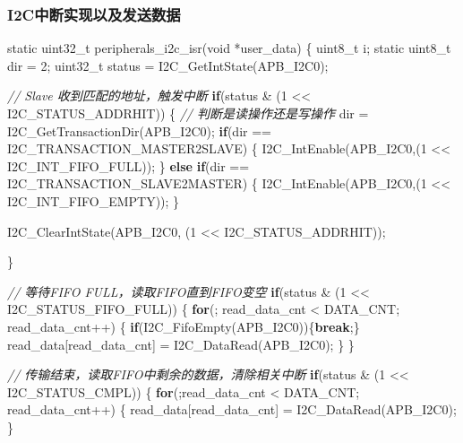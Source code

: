 \documentclass[
  12pt,
]{book}
\newenvironment{Shaded}{\begin{snugshade}}{\end{snugshade}}
\newcommand{\CommentTok}[1]{\textcolor[rgb]{0.56,0.35,0.01}{\textit{#1}}}
\newcommand{\ControlFlowTok}[1]{\textcolor[rgb]{0.13,0.29,0.53}{\textbf{#1}}}
\newcommand{\DataTypeTok}[1]{\textcolor[rgb]{0.13,0.29,0.53}{#1}}
\newcommand{\DecValTok}[1]{\textcolor[rgb]{0.00,0.00,0.81}{#1}}
\newcommand{\NormalTok}[1]{#1}
\begin{document}
\hypertarget{i2cux4e2dux65adux5b9eux73b0ux4ee5ux53caux53d1ux9001ux6570ux636e-1}{%
\subsubsection{I2C中断实现以及发送数据}\label{i2cux4e2dux65adux5b9eux73b0ux4ee5ux53caux53d1ux9001ux6570ux636e-1}}

\begin{Shaded}
\begin{Highlighting}[]
\DataTypeTok{static} \DataTypeTok{uint32_t}\NormalTok{ peripherals_i2c_isr(}\DataTypeTok{void}\NormalTok{ *user_data)}
\NormalTok{\{}
  \DataTypeTok{uint8_t}\NormalTok{ i;}
  \DataTypeTok{static} \DataTypeTok{uint8_t}\NormalTok{ dir = }\DecValTok{2}\NormalTok{;}
  \DataTypeTok{uint32_t}\NormalTok{ status = I2C_GetIntState(APB_I2C0);}

  \CommentTok{// Slave 收到匹配的地址，触发中断}
  \ControlFlowTok{if}\NormalTok{(status & (}\DecValTok{1}\NormalTok{ << I2C_STATUS_ADDRHIT))}
\NormalTok{  \{}
    \CommentTok{// 判断是读操作还是写操作}
\NormalTok{    dir = I2C_GetTransactionDir(APB_I2C0);}
    \ControlFlowTok{if}\NormalTok{(dir == I2C_TRANSACTION_MASTER2SLAVE)}
\NormalTok{    \{}
\NormalTok{        I2C_IntEnable(APB_I2C0,(}\DecValTok{1}\NormalTok{ << I2C_INT_FIFO_FULL));}
\NormalTok{    \}}
    \ControlFlowTok{else} \ControlFlowTok{if}\NormalTok{(dir == I2C_TRANSACTION_SLAVE2MASTER)}
\NormalTok{    \{}
\NormalTok{        I2C_IntEnable(APB_I2C0,(}\DecValTok{1}\NormalTok{ << I2C_INT_FIFO_EMPTY));}
\NormalTok{    \}}

\NormalTok{    I2C_ClearIntState(APB_I2C0, (}\DecValTok{1}\NormalTok{ << I2C_STATUS_ADDRHIT));}

\NormalTok{  \}}
  
  \CommentTok{// 等待FIFO FULL，读取FIFO直到FIFO变空}
  \ControlFlowTok{if}\NormalTok{(status & (}\DecValTok{1}\NormalTok{ << I2C_STATUS_FIFO_FULL))}
\NormalTok{  \{}
    \ControlFlowTok{for}\NormalTok{(; read_data_cnt < DATA_CNT; read_data_cnt++)}
\NormalTok{    \{}
      \ControlFlowTok{if}\NormalTok{(I2C_FifoEmpty(APB_I2C0))\{}\ControlFlowTok{break}\NormalTok{;\}}
\NormalTok{      read_data[read_data_cnt] = I2C_DataRead(APB_I2C0);}
\NormalTok{    \}}
\NormalTok{  \}}
  
  \CommentTok{// 传输结束，读取FIFO中剩余的数据，清除相关中断}
  \ControlFlowTok{if}\NormalTok{(status & (}\DecValTok{1}\NormalTok{ << I2C_STATUS_CMPL))}
\NormalTok{  \{}
    \ControlFlowTok{for}\NormalTok{(;read_data_cnt < DATA_CNT; read_data_cnt++)}
\NormalTok{    \{}
\NormalTok{      read_data[read_data_cnt] = I2C_DataRead(APB_I2C0);}
\NormalTok{    \}}
    

\end{Highlighting}
\end{Shaded}
\end{document}
